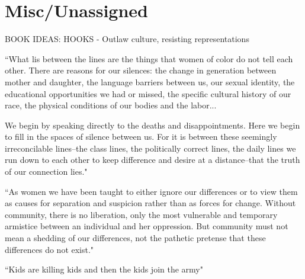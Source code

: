 \documentclass[a4paper, 11pt]{article} %
\begin{document}


\section*{Misc/Unassigned}

BOOK IDEAS:
HOOKS - Outlaw culture, resisting representations

``What lis between the lines are the things that women of color do not tell each other. There are reasons for our silences: the change in generation between mother and daughter, the language barriers between us, our sexual identity, the educational opportunities we had or missed, the specific cultural history of our race, the physical conditions of our bodies and the labor...

We begin by speaking directly to the deaths and disappointments. Here we begin to fill in the spaces of silence between us. For it is between these seemingly irreconcilable lines--the class lines, the politically correct lines, the daily lines we run down to each other to keep difference and desire at a distance--that the truth of our connection lies."\cite{thebridge}

``As women we have been taught to either ignore our differences or to view them as causes for separation and suspicion rather than as forces for change. Without community, there is no liberation, only the most vulnerable and temporary armistice between an individual and her oppression. But community must not mean a shedding of our differences, not the pathetic pretense that these differences do not exist."\cite{lorde}

``Kids are killing kids and then the kids join the army"\cite{danceordie}


\nocite{*}
{}


\end{document}
